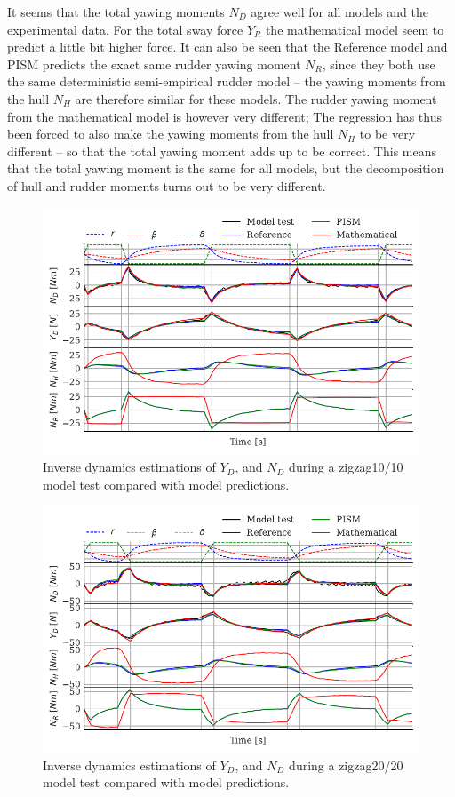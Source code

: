 It seems that the total yawing moments $N_D$ agree well for all models and the experimental data. For the total sway force $Y_R$ the mathematical model seem to predict a little bit higher force.  
It can also be seen that the Reference model and PISM predicts the exact same rudder yawing moment $N_R$, since they both use the same deterministic semi-empirical rudder model -- the yawing moments from the hull $N_H$ are therefore similar for these models. The rudder yawing moment from the mathematical model is however very different; The regression has thus been forced to also make the yawing moments from the hull $N_H$ to be very different -- so that the total yawing moment adds up to be correct. This means that the total yawing moment is the same for all models, but the decomposition of hull and rudder moments turns out to be very different.
\begin{figure}[h]
    \centering
    \includegraphics[width=\columnwidth]{figures/results.ID_zigzag10.pdf}
    \caption{Inverse dynamics estimations of $Y_D$, and $N_D$ during a zigzag10/10 model test compared with model predictions.}
    \label{fig:ID_zigzag10}
\end{figure}
\begin{figure}[h]
    \centering
    \includegraphics[width=\columnwidth]{figures/results.ID_zigzag20.pdf}
    \caption{Inverse dynamics estimations of $Y_D$, and $N_D$ during a zigzag20/20 model test compared with model predictions.}
    \label{fig:ID_zigzag20}
\end{figure}

